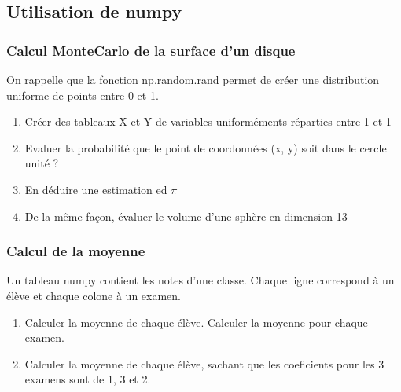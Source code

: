 \documentclass[letterpaper,10pt,english]{sphinxhowto}
\begin{document}
\subsection{Utilisation de numpy}
\label{\detokenize{cours5_numpy_exercices:utilisation-de-numpy}}\label{\detokenize{cours5_numpy_exercices::doc}}

\subsubsection{Calcul Monte\sphinxhyphen{}Carlo de la surface d’un disque}
\label{\detokenize{cours5_numpy_exercices:calcul-monte-carlo-de-la-surface-d-un-disque}}
\sphinxAtStartPar
On rappelle que la fonction np.random.rand permet de créer une distribution uniforme de points entre 0 et 1.
\begin{enumerate}
%
\item {} 
\sphinxAtStartPar
Créer des tableaux X et Y de variables uniforméments réparties entre \sphinxhyphen{}1 et 1

\item {} 
\sphinxAtStartPar
Evaluer la probabilité que le point de coordonnées (x, y) soit dans le cercle unité ?

\item {} 
\sphinxAtStartPar
En déduire une estimation ed \(\pi\)

\item {} 
\sphinxAtStartPar
De la même façon, évaluer le volume d’une sphère en dimension 13

\end{enumerate}


\subsubsection{Calcul de la moyenne}
\label{\detokenize{cours5_numpy_exercices:calcul-de-la-moyenne}}
\sphinxAtStartPar
Un tableau numpy contient les notes d’une classe. Chaque ligne correspond à un élève et chaque colone à un examen.

\begin{sphinxVerbatim}[commandchars=\\\{\}]
   

  
  

   
\end{sphinxVerbatim}
\begin{enumerate}
%
\item {} 
\sphinxAtStartPar
Calculer la moyenne de chaque élève. Calculer la moyenne pour chaque examen.

\item {} 
\sphinxAtStartPar
Calculer la moyenne de chaque élève, sachant que les coeficients pour les 3 examens sont de 1, 3 et 2.

\end{enumerate}
\end{document}
